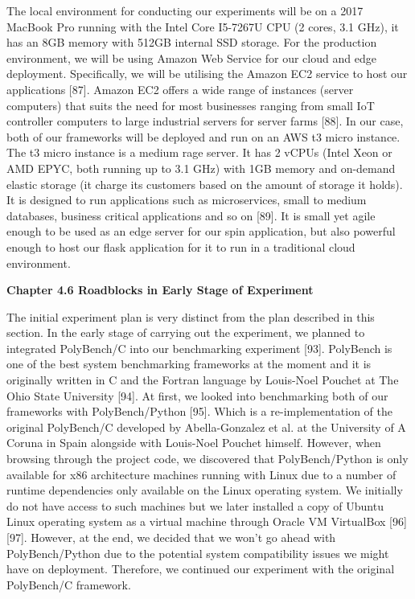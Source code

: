 The local environment for conducting our experiments will be on a 2017 MacBook Pro running with the Intel Core I5-7267U CPU (2 cores, 3.1 GHz), it has an 8GB memory with 512GB internal SSD storage. For the production environment, we will be using Amazon Web Service for our cloud and edge deployment. Specifically, we will be utilising the Amazon EC2 service to host our applications [87]. Amazon EC2 offers a wide range of instances (server computers) that suits the need for most businesses ranging from small IoT controller computers to large industrial servers for server farms [88]. In our case, both of our frameworks will be deployed and run on an AWS t3 micro instance. The t3 micro instance is a medium rage server. It has 2 vCPUs (Intel Xeon or AMD EPYC, both running up to 3.1 GHz) with 1GB memory and on-demand elastic storage (it charge its customers based on the amount of storage it holds). It is designed to run applications such as microservices, small to medium databases, business critical applications and so on [89]. It is small yet agile enough to be used as an edge server for our spin application, but also powerful enough to host our flask application for it to run in a traditional cloud environment.

\bigskip
\textbf{{\Large Chapter 4.6 Roadblocks in Early Stage of Experiment}}

The initial experiment plan is very distinct from the plan described in this section. In the early stage of carrying out the experiment, we planned to integrated PolyBench/C into our benchmarking experiment [93]. PolyBench is one of the best system benchmarking frameworks at the moment and it is originally written in C and the Fortran language by Louis-Noel Pouchet at The Ohio State University [94]. At first, we looked into benchmarking both of our frameworks with PolyBench/Python [95]. Which is a re-implementation of the original PolyBench/C developed by Abella-Gonzalez et al. at the University of A Coruna in Spain alongside with Louis-Noel Pouchet himself. However, when browsing through the project code, we discovered that PolyBench/Python is only available for x86 architecture machines running with Linux due to a number of runtime dependencies only available on the Linux operating system. We initially do not have access to such machines but we later installed a copy of Ubuntu Linux operating system as a virtual machine through Oracle VM VirtualBox [96] [97]. However, at the end, we decided that we won't go ahead with PolyBench/Python due to the potential system compatibility issues we might have on deployment. Therefore, we continued our experiment with the original PolyBench/C framework.

